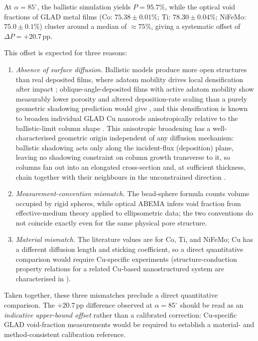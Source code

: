 \documentclass[aip,amsmath,amssymb,reprint]{revtex4-1}
\newcommand{\dang}{\ensuremath{\alpha}}
\newcommand{\bsP}{\ensuremath{P}}
\begin{document}
At $\dang = 85^{\circ}$, the ballistic simulation yields $\bsP = 95.7\%$,
while the optical void fractions of GLAD metal films
(Co: $75.38 \pm 0.01\%$; Ti: $78.30 \pm 0.04\%$;
NiFeMo: $75.0 \pm 0.1\%$) cluster around a median of
$\approx 75\%$, giving a systematic offset of
$\Delta\bsP = +20.7\,\mathrm{pp}$.

This offset is expected for three reasons:
\begin{enumerate}
  \item \textit{Absence of surface diffusion.}  Ballistic models
    produce more open structures than real deposited films, where
    adatom mobility drives local densification after impact
    \citep{jamnig2019}; oblique-angle-deposited films with active
    adatom mobility show measurably lower porosity and altered
    deposition-rate scaling than a purely geometric shadowing prediction
    would give \citep{poxson2008porosity}, and this densification is
    known to broaden individual GLAD Cu nanorods anisotropically relative
    to the ballistic-limit column shape \citep{kesapragada2006}. This
    anisotropic broadening has a well-characterised geometric origin
    independent of any diffusion mechanism: ballistic shadowing acts only
    along the incident-flux (deposition) plane, leaving no shadowing
    constraint on column growth transverse to it, so columns fan out into
    an elongated cross-section and, at sufficient thickness, chain together
    with their neighbours in the unconstrained direction
    \citep{vick2002growth}.
  \item \textit{Measurement-convention mismatch.}  The bead-sphere
    formula counts volume occupied by rigid spheres, while optical ABEMA
    infers void fraction from effective-medium theory applied to
    ellipsometric data; the two conventions do not coincide exactly
    even for the same physical pore structure.
  \item \textit{Material mismatch.}  The literature values are for
    Co, Ti, and NiFeMo; Cu has a different diffusion length and
    sticking coefficient, so a direct quantitative comparison would
    require Cu-specific experiments (structure-conduction property
    relations for a related Cu-based nanostructured system are
    characterised in \citet{elbeainou2019}).
\end{enumerate}

Taken together, these three mismatches preclude a direct quantitative
comparison.  The $+20.7\,\mathrm{pp}$ difference observed at $\dang=85^{\circ}$
should be read as an \textit{indicative upper-bound offset} rather than
a calibrated correction: Cu-specific GLAD void-fraction measurements
would be required to establish a material- and method-consistent
calibration reference.
\end{document}
